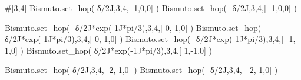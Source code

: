 \documentclass[
  letterpaper,
  DIV=11,
  numbers=noendperiod]{scrreprt}
\newenvironment{Shaded}{\begin{snugshade}}{\end{snugshade}}
\newcommand{\CommentTok}[1]{\textcolor[rgb]{0.37,0.37,0.37}{#1}}
\newcommand{\DecValTok}[1]{\textcolor[rgb]{0.68,0.00,0.00}{#1}}
\newcommand{\NormalTok}[1]{\textcolor[rgb]{0.00,0.23,0.31}{#1}}
\newcommand{\OperatorTok}[1]{\textcolor[rgb]{0.37,0.37,0.37}{#1}}
\newcommand{\OtherTok}[1]{\textcolor[rgb]{0.00,0.23,0.31}{#1}}
\begin{document}
\begin{Shaded}
\begin{Highlighting}[]
\CommentTok{\#[3,4]}
\NormalTok{Bismuto.set\_hop(   δ}\OperatorTok{/}\OtherTok{2J}\NormalTok{,}\DecValTok{3}\NormalTok{,}\DecValTok{4}\NormalTok{,[  }\DecValTok{1}\NormalTok{,}\DecValTok{0}\NormalTok{,}\DecValTok{0}\NormalTok{] ) }
\NormalTok{Bismuto.set\_hop(  }\OperatorTok{{-}}\NormalTok{δ}\OperatorTok{/}\OtherTok{2J}\NormalTok{,}\DecValTok{3}\NormalTok{,}\DecValTok{4}\NormalTok{,[ }\OperatorTok{{-}}\DecValTok{1}\NormalTok{,}\DecValTok{0}\NormalTok{,}\DecValTok{0}\NormalTok{] ) }

\NormalTok{Bismuto.set\_hop(  }\OperatorTok{{-}}\NormalTok{δ}\OperatorTok{/}\OtherTok{2J}\OperatorTok{*}\NormalTok{exp(}\OperatorTok{{-}}\OtherTok{1J}\OperatorTok{*}\NormalTok{pi}\OperatorTok{/}\DecValTok{3}\NormalTok{),}\DecValTok{3}\NormalTok{,}\DecValTok{4}\NormalTok{,[  }\DecValTok{0}\NormalTok{, }\DecValTok{1}\NormalTok{,}\DecValTok{0}\NormalTok{] ) }
\NormalTok{Bismuto.set\_hop(   δ}\OperatorTok{/}\OtherTok{2J}\OperatorTok{*}\NormalTok{exp(}\OperatorTok{{-}}\OtherTok{1J}\OperatorTok{*}\NormalTok{pi}\OperatorTok{/}\DecValTok{3}\NormalTok{),}\DecValTok{3}\NormalTok{,}\DecValTok{4}\NormalTok{,[  }\DecValTok{0}\NormalTok{,}\OperatorTok{{-}}\DecValTok{1}\NormalTok{,}\DecValTok{0}\NormalTok{] )}
\NormalTok{Bismuto.set\_hop(  }\OperatorTok{{-}}\NormalTok{δ}\OperatorTok{/}\OtherTok{2J}\OperatorTok{*}\NormalTok{exp(}\OperatorTok{{-}}\OtherTok{1J}\OperatorTok{*}\NormalTok{pi}\OperatorTok{/}\DecValTok{3}\NormalTok{),}\DecValTok{3}\NormalTok{,}\DecValTok{4}\NormalTok{,[ }\OperatorTok{{-}}\DecValTok{1}\NormalTok{, }\DecValTok{1}\NormalTok{,}\DecValTok{0}\NormalTok{] )}
\NormalTok{Bismuto.set\_hop(   δ}\OperatorTok{/}\OtherTok{2J}\OperatorTok{*}\NormalTok{exp(}\OperatorTok{{-}}\OtherTok{1J}\OperatorTok{*}\NormalTok{pi}\OperatorTok{/}\DecValTok{3}\NormalTok{),}\DecValTok{3}\NormalTok{,}\DecValTok{4}\NormalTok{,[  }\DecValTok{1}\NormalTok{,}\OperatorTok{{-}}\DecValTok{1}\NormalTok{,}\DecValTok{0}\NormalTok{] )}

\NormalTok{Bismuto.set\_hop(   δ}\OperatorTok{/}\OtherTok{2J}\NormalTok{,}\DecValTok{3}\NormalTok{,}\DecValTok{4}\NormalTok{,[  }\DecValTok{2}\NormalTok{, }\DecValTok{1}\NormalTok{,}\DecValTok{0}\NormalTok{] ) }
\NormalTok{Bismuto.set\_hop(  }\OperatorTok{{-}}\NormalTok{δ}\OperatorTok{/}\OtherTok{2J}\NormalTok{,}\DecValTok{3}\NormalTok{,}\DecValTok{4}\NormalTok{,[ }\OperatorTok{{-}}\DecValTok{2}\NormalTok{,}\OperatorTok{{-}}\DecValTok{1}\NormalTok{,}\DecValTok{0}\NormalTok{] ) }


\end{Highlighting}
\end{Shaded}
\end{document}
